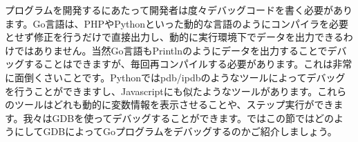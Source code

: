 プログラムを開発するにあたって開発者は度々デバッグコードを書く必要があります。Go言語は、PHPやPythonといった動的な言語のようにコンパイラを必要とせず修正を行うだけで直接出力し、動的に実行環境下でデータを出力できるわけではありません。当然Go言語もPrintlnのようにデータを出力することでデバッグすることはできますが、毎回再コンパイルする必要があります。これは非常に面倒くさいことです。Pythonではpdb/ipdbのようなツールによってデバッグを行うことができますし、Javascriptにも似たようなツールがあります。これらのツールはどれも動的に変数情報を表示させることや、ステップ実行ができます。我々はGDBを使ってデバッグすることができます。ではこの節ではどのようにしてGDBによってGoプログラムをデバッグするのかご紹介しましょう。
